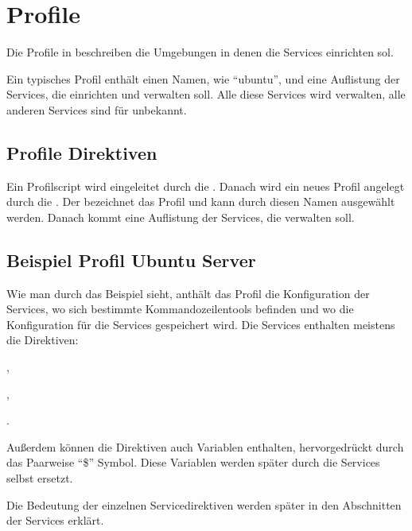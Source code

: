 \section{Profile}

Die Profile in \sscontrol{} beschreiben die Umgebungen in denen \sscontrol{} die
Services einrichten sol.

Ein typisches Profil enthält einen Namen, wie ``ubuntu'', und eine Auflistung
der Services, die \sscontrol{} einrichten und verwalten soll. Alle diese
Services wird \sscontrol{} verwalten, alle anderen Services sind für
\sscontrol{} unbekannt.

\subsection{Profile Direktiven}

Ein Profilscript wird eingeleitet durch die .
Danach wird ein neues Profil angelegt durch die
. Der  bezeichnet das Profil
und kann durch diesen Namen ausgewählt werden. Danach kommt eine Auflistung der
Services, die \sscontrol{} verwalten soll.

\subsection{Beispiel Profil Ubuntu Server}

Wie man durch das Beispiel sieht, anthält das Profil die Konfiguration der
Services, wo sich bestimmte Kommandozeilentools befinden und wo die
Konfiguration für die Services gespeichert wird. Die Services enthalten meistens
die Direktiven:
\begin{inparaitem}
\item {},
\item {},
\item {}
\end{inparaitem}. 

Außerdem können die Direktiven auch Variablen enthalten, hervorgedrückt durch
das Paarweise ``\$'' Symbol. Diese Variablen werden später durch die Services
selbst ersetzt.

Die Bedeutung der einzelnen Servicedirektiven werden später in den Abschnitten
der Services erklärt.

